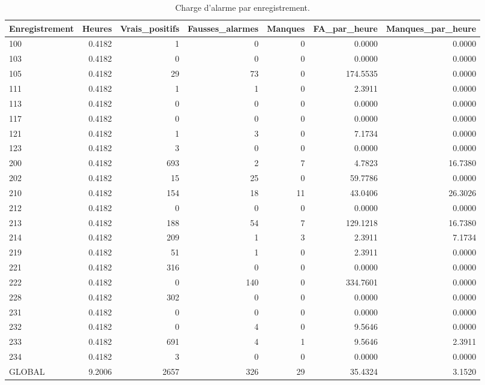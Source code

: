 \begin{table}
\caption{Charge d'alarme par enregistrement.}
\label{tab:alarms}
\begin{tabular}{lrrrrrr}
\toprule
Enregistrement & Heures & Vrais_positifs & Fausses_alarmes & Manques & FA_par_heure & Manques_par_heure \\
\midrule
100 & 0.4182 & 1 & 0 & 0 & 0.0000 & 0.0000 \\
103 & 0.4182 & 0 & 0 & 0 & 0.0000 & 0.0000 \\
105 & 0.4182 & 29 & 73 & 0 & 174.5535 & 0.0000 \\
111 & 0.4182 & 1 & 1 & 0 & 2.3911 & 0.0000 \\
113 & 0.4182 & 0 & 0 & 0 & 0.0000 & 0.0000 \\
117 & 0.4182 & 0 & 0 & 0 & 0.0000 & 0.0000 \\
121 & 0.4182 & 1 & 3 & 0 & 7.1734 & 0.0000 \\
123 & 0.4182 & 3 & 0 & 0 & 0.0000 & 0.0000 \\
200 & 0.4182 & 693 & 2 & 7 & 4.7823 & 16.7380 \\
202 & 0.4182 & 15 & 25 & 0 & 59.7786 & 0.0000 \\
210 & 0.4182 & 154 & 18 & 11 & 43.0406 & 26.3026 \\
212 & 0.4182 & 0 & 0 & 0 & 0.0000 & 0.0000 \\
213 & 0.4182 & 188 & 54 & 7 & 129.1218 & 16.7380 \\
214 & 0.4182 & 209 & 1 & 3 & 2.3911 & 7.1734 \\
219 & 0.4182 & 51 & 1 & 0 & 2.3911 & 0.0000 \\
221 & 0.4182 & 316 & 0 & 0 & 0.0000 & 0.0000 \\
222 & 0.4182 & 0 & 140 & 0 & 334.7601 & 0.0000 \\
228 & 0.4182 & 302 & 0 & 0 & 0.0000 & 0.0000 \\
231 & 0.4182 & 0 & 0 & 0 & 0.0000 & 0.0000 \\
232 & 0.4182 & 0 & 4 & 0 & 9.5646 & 0.0000 \\
233 & 0.4182 & 691 & 4 & 1 & 9.5646 & 2.3911 \\
234 & 0.4182 & 3 & 0 & 0 & 0.0000 & 0.0000 \\
GLOBAL & 9.2006 & 2657 & 326 & 29 & 35.4324 & 3.1520 \\
\bottomrule
\end{tabular}
\end{table}
